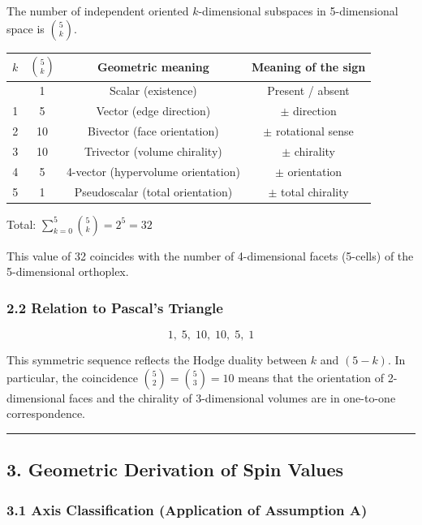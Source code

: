 \documentclass[a4paper,11pt]{article}
\newcounter{none}
\begin{document}
The number of independent oriented $k$-dimensional subspaces in 5-dimensional space is $\binom{5}{k}$.

{\def\LTcaptype{none}
\begin{longtable}[]{@{}cccc@{}}
\toprule
$k$ & $\binom{5}{k}$ & Geometric meaning & Meaning of the sign \\
\midrule
\endhead
\bottomrule
\endlastfoot
0 & 1 & Scalar (existence) & Present / absent \\
1 & 5 & Vector (edge direction) & $\pm$ direction \\
2 & 10 & Bivector (face orientation) & $\pm$ rotational sense \\
3 & 10 & Trivector (volume chirality) & $\pm$ chirality \\
4 & 5 & 4-vector (hypervolume orientation) & $\pm$ orientation \\
5 & 1 & Pseudoscalar (total orientation) & $\pm$ total chirality \\
\end{longtable}
}

Total: $\sum_{k=0}^{5} \binom{5}{k} = 2^5 = 32$

This value of 32 coincides with the number of 4-dimensional facets (5-cells) of the 5-dimensional orthoplex.

\subsubsection*{2.2 Relation to Pascal's Triangle}

\[1, \; 5, \; 10, \; 10, \; 5, \; 1\]

This symmetric sequence reflects the Hodge duality between $k$ and $(5-k)$. In particular, the coincidence $\binom{5}{2} = \binom{5}{3} = 10$ means that the orientation of 2-dimensional faces and the chirality of 3-dimensional volumes are in one-to-one correspondence.

\begin{center}\rule{0.5\linewidth}{0.5pt}\end{center}

\subsection*{3. Geometric Derivation of Spin Values}

\subsubsection*{3.1 Axis Classification (Application of Assumption A)}
\end{document}
